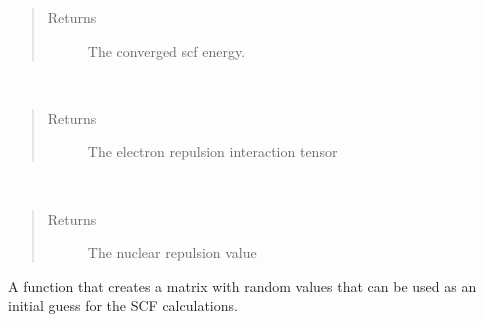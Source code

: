 \documentclass[letterpaper,10pt,english]{sphinxmanual}
\begin{document}
\begin{fulllineitems}
\begin{fulllineitems}
\begin{quote}
\begin{description}
\item[{Returns}] \leavevmode
The converged scf energy.

\end{description}\end{quote}

\end{fulllineitems}


\begin{fulllineitems}
\label{\detokenize{cUHF_s:hf.HartreeFock.cUHF_s.MF.get_two_e}}~\begin{quote}\begin{description}
\item[{Returns}] \leavevmode
The electron repulsion interaction tensor

\end{description}\end{quote}

\end{fulllineitems}


\begin{fulllineitems}
\label{\detokenize{cUHF_s:hf.HartreeFock.cUHF_s.MF.nuc_rep}}~\begin{quote}\begin{description}
\item[{Returns}] \leavevmode
The nuclear repulsion value

\end{description}\end{quote}

\end{fulllineitems}


\begin{fulllineitems}
\label{\detokenize{cUHF_s:hf.HartreeFock.cUHF_s.MF.random_guess}}
A function that creates a matrix with random values that can be used as an initial guess
for the SCF calculations.


\end{fulllineitems}
\end{fulllineitems}
\end{document}
